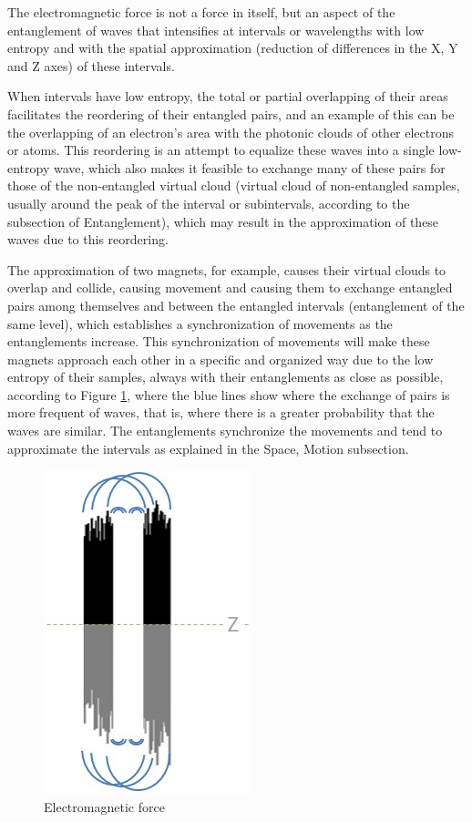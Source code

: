 The electromagnetic force is not a force in itself, but an aspect of the entanglement of waves that intensifies at intervals or wavelengths with low entropy and with the spatial approximation (reduction of differences in the X, Y and Z axes) of these intervals.

When intervals have low entropy, the total or partial overlapping of their areas facilitates the reordering of their entangled pairs, and an example of this can be the overlapping of an electron's area with the photonic clouds of other electrons or atoms. This reordering is an attempt to equalize these waves into a single low-entropy wave, which also makes it feasible to exchange many of these pairs for those of the non-entangled virtual cloud (virtual cloud of non-entangled samples, usually around the peak of the interval or subintervals, according to the subsection of Entanglement), which may result in the approximation of these waves due to this reordering.

The approximation of two magnets, for example, causes their virtual clouds to overlap and collide, causing movement and causing them to exchange entangled pairs among themselves and between the entangled intervals (entanglement of the same level), which establishes a synchronization of movements as the entanglements increase. This synchronization of movements will make these magnets approach each other in a specific and organized way due to the low entropy of their samples, always with their entanglements as close as possible, according to Figure \ref{fig:consciousness_electromaagnetic_force}, where the blue lines show where the exchange of pairs is more frequent of waves, that is, where there is a greater probability that the waves are similar. The entanglements synchronize the movements and tend to approximate the intervals as explained in the Space, Motion subsection.
	\begin{figure}[H]
	\caption{Electromagnetic force}
	\label{fig:consciousness_electromaagnetic_force}
	\centering
	\includegraphics[scale=.9]{sections/images/consciousness_electromaagnetic_force.jpg}
	\end{figure}

